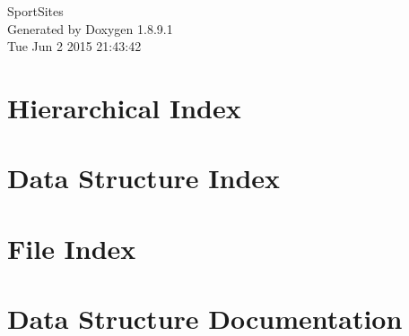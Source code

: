 \documentclass[twoside]{book}
\newcommand{\+}{\discretionary{\mbox{\scriptsize$\hookleftarrow$}}{}{}}
\newcommand{\clearemptydoublepage}{%
  \newpage{\pagestyle{empty}\cleardoublepage}%
}
\begin{document}
\hypersetup{pageanchor=false,
             bookmarks=true,
             bookmarksnumbered=true,
             pdfencoding=unicode
            }
\begin{titlepage}
\vspace*{7cm}
\begin{center}%
{\Large Sport\+Sites }\\
\vspace*{1cm}
{\large Generated by Doxygen 1.8.9.1}\\
\vspace*{0.5cm}
{\small Tue Jun 2 2015 21:43:42}\\
\end{center}
\end{titlepage}
\clearemptydoublepage
\tableofcontents
\clearemptydoublepage
{}
\hypersetup{pageanchor=true}

\chapter{Hierarchical Index}

\chapter{Data Structure Index}

\chapter{File Index}

\chapter{Data Structure Documentation}





















\end{document}
